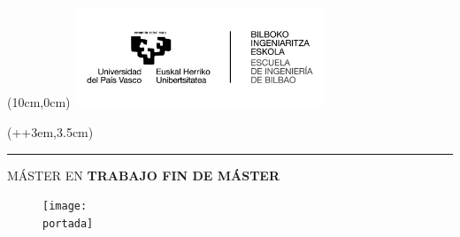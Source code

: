 
\begin{titlepage}
    \begin{textblock*}{\textwidth}(10cm,0cm)
        \includegraphics[width=7.5cm, height=3cm]{images/shared/Logo_EHU.jpg}
    \end{textblock*}
    
    
    \begin{textblock*}{\paperwidth}(\dimexpr\parindent+\oddsidemargin+3em\relax,3.5cm)
        \begin{minipage}{\dimexpr\linewidth-7.5cm\relax}
            \color{white}
            \noindent\rule{\linewidth}{0cm}
            \textsf{ {\large MÁSTER EN \master}}
            \newline
            \newline \newline
            \textsf{\textbf{ {\Huge TRABAJO FIN DE MÁSTER }}}
        \end{minipage}
    \end{textblock*}
    
    \vspace*{3.5cm}
    \begin{minipage}{\linewidth}
        \setlength{\baselineskip}{1.7\baselineskip}
        \centering
        \textsf{ \textbf{ {\LARGE \titulo }}}
    \end{minipage}

    \vspace*{0.5cm}
    \begin{figure}[H]
        \centering
        \texttt{[image: \\portada]}
    \end{figure}


\end{titlepage}
